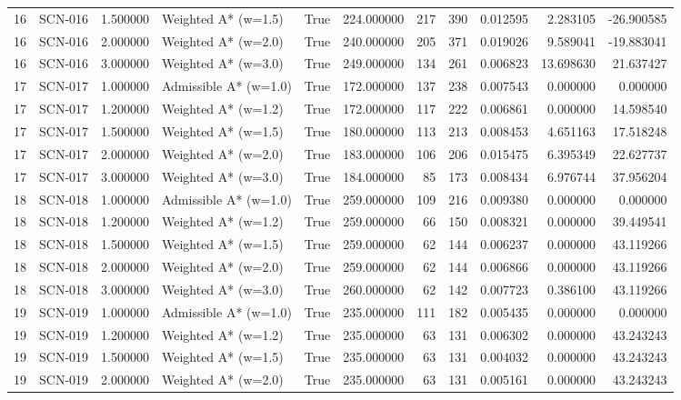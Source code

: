 \begin{table}[htbp]
\begin{tabular}{rlrlrrrrrrr}
16 & SCN-016 & 1.500000 & Weighted A* (w=1.5) & True & 224.000000 & 217 & 390 & 0.012595 & 2.283105 & -26.900585 \\
16 & SCN-016 & 2.000000 & Weighted A* (w=2.0) & True & 240.000000 & 205 & 371 & 0.019026 & 9.589041 & -19.883041 \\
16 & SCN-016 & 3.000000 & Weighted A* (w=3.0) & True & 249.000000 & 134 & 261 & 0.006823 & 13.698630 & 21.637427 \\
17 & SCN-017 & 1.000000 & Admissible A* (w=1.0) & True & 172.000000 & 137 & 238 & 0.007543 & 0.000000 & 0.000000 \\
17 & SCN-017 & 1.200000 & Weighted A* (w=1.2) & True & 172.000000 & 117 & 222 & 0.006861 & 0.000000 & 14.598540 \\
17 & SCN-017 & 1.500000 & Weighted A* (w=1.5) & True & 180.000000 & 113 & 213 & 0.008453 & 4.651163 & 17.518248 \\
17 & SCN-017 & 2.000000 & Weighted A* (w=2.0) & True & 183.000000 & 106 & 206 & 0.015475 & 6.395349 & 22.627737 \\
17 & SCN-017 & 3.000000 & Weighted A* (w=3.0) & True & 184.000000 & 85 & 173 & 0.008434 & 6.976744 & 37.956204 \\
18 & SCN-018 & 1.000000 & Admissible A* (w=1.0) & True & 259.000000 & 109 & 216 & 0.009380 & 0.000000 & 0.000000 \\
18 & SCN-018 & 1.200000 & Weighted A* (w=1.2) & True & 259.000000 & 66 & 150 & 0.008321 & 0.000000 & 39.449541 \\
18 & SCN-018 & 1.500000 & Weighted A* (w=1.5) & True & 259.000000 & 62 & 144 & 0.006237 & 0.000000 & 43.119266 \\
18 & SCN-018 & 2.000000 & Weighted A* (w=2.0) & True & 259.000000 & 62 & 144 & 0.006866 & 0.000000 & 43.119266 \\
18 & SCN-018 & 3.000000 & Weighted A* (w=3.0) & True & 260.000000 & 62 & 142 & 0.007723 & 0.386100 & 43.119266 \\
19 & SCN-019 & 1.000000 & Admissible A* (w=1.0) & True & 235.000000 & 111 & 182 & 0.005435 & 0.000000 & 0.000000 \\
19 & SCN-019 & 1.200000 & Weighted A* (w=1.2) & True & 235.000000 & 63 & 131 & 0.006302 & 0.000000 & 43.243243 \\
19 & SCN-019 & 1.500000 & Weighted A* (w=1.5) & True & 235.000000 & 63 & 131 & 0.004032 & 0.000000 & 43.243243 \\
19 & SCN-019 & 2.000000 & Weighted A* (w=2.0) & True & 235.000000 & 63 & 131 & 0.005161 & 0.000000 & 43.243243 \\

\end{tabular}
\end{table}

